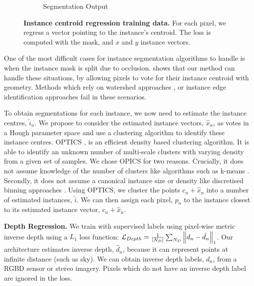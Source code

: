 \begin{figure}[t]
\begin{center}
\begin{subfigure}[t]{0.24\linewidth}
  \caption{Segmentation Output}
\end{subfigure}
\end{center}
   \caption[Instance centroid regression example.]{\textbf{Instance centroid regression training data.} For each pixel, we regress a vector pointing to the instance's centroid. The loss is computed with the mask, and $x$ and $y$ instance vectors.}
\label{fig:instance}
\end{figure}

One of the most difficult cases for instance segmentation algorithms to handle is when the instance mask is split due to occlusion.  shows that our method can handle these situations, by allowing pixels to vote for their instance centroid with geometry. Methods which rely on watershed approaches \citep{bai2016deep}, or instance edge identification approaches fail in these scenarios.

To obtain segmentations for each instance, we now need to estimate the instance centres, $\hat{i}_n$. We propose to consider the estimated instance vectors, $\hat{x}_n$, as votes in a Hough parameter space and use a clustering algorithm to identify these instance centres. OPTICS \citep{ankerst1999optics}, is an efficient density based clustering algorithm. It is able to identify an unknown number of multi-scale clusters with varying density from a given set of samples. We chose OPICS for two reasons. Crucially, it does not assume knowledge of the number of clusters like algorithms such as k-means \citep{macqueen1967some}. Secondly, it does not assume a canonical instance size or density like discretised binning approaches \citep{comaniciu2002mean}. Using OPTICS, we cluster the points $c_n+\hat{x}_n$ into a number of estimated instances, $\hat{i}$. We can then assign each pixel, $p_n$ to the instance closest to its estimated instance vector, $c_n+\hat{x}_n$.

\textbf{Depth Regression.}
We train with supervised labels using pixel-wise metric inverse depth using a $L_1$ loss function: $\mathcal{L}_{Depth} = \frac{1}{|N_D|} \sum_{N_D} \left\lVert d_n-\hat{d_n} \right\rVert_1$. Our architecture estimates inverse depth, $\hat{d}_n$, because it can represent points at infinite distance (such as sky). We can obtain inverse depth labels, $d_n$, from a RGBD sensor or stereo imagery. Pixels which do not have an inverse depth label are ignored in the loss.

